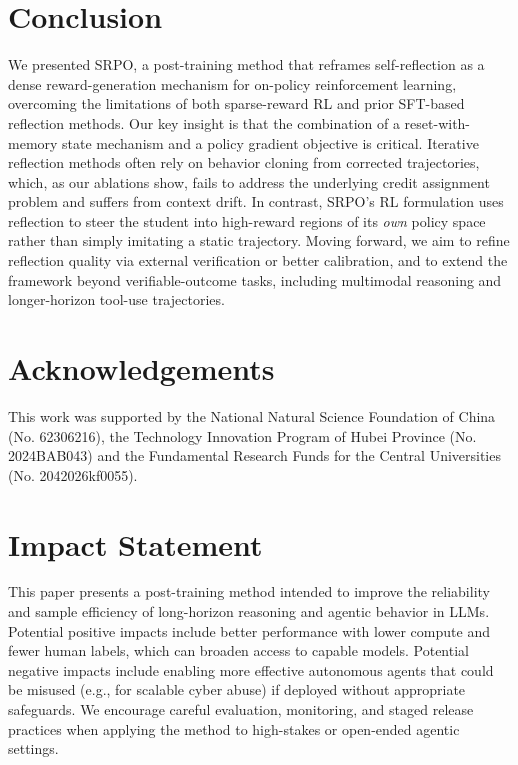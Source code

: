\documentclass{article}
\newcommand{\method}{SRPO}
\theoremstyle{plain}
\theoremstyle{definition}
\theoremstyle{remark}
\begin{document}
\section{Conclusion}
\label{conclusion}

We presented \method{}, a post-training method that reframes self-reflection as a dense reward-generation mechanism for on-policy reinforcement learning, overcoming the limitations of both sparse-reward RL and prior SFT-based reflection methods. Our key insight is that the combination of a reset-with-memory state mechanism and a policy gradient objective is critical. Iterative reflection methods often rely on behavior cloning from corrected trajectories, which, as our ablations show, fails to address the underlying credit assignment problem and suffers from context drift. In contrast, SRPO's RL formulation uses reflection to steer the student into high-reward regions of its \emph{own} policy space rather than simply imitating a static trajectory. Moving forward, we aim to refine reflection quality via external verification or better calibration, and to extend the framework beyond verifiable-outcome tasks, including multimodal reasoning and longer-horizon tool-use trajectories.
\newpage

\section*{Acknowledgements}
This work was supported by the National Natural Science Foundation of China
(No. 62306216), the Technology Innovation Program of Hubei Province
(No. 2024BAB043) and the Fundamental Research Funds for the Central Universities 
(No. 2042026kf0055).

\section*{Impact Statement}
This paper presents a post-training method intended to improve the reliability and sample efficiency of long-horizon reasoning and agentic behavior in LLMs.
Potential positive impacts include better performance with lower compute and fewer human labels, which can broaden access to capable models.
Potential negative impacts include enabling more effective autonomous agents that could be misused (e.g., for scalable cyber abuse) if deployed without appropriate safeguards.
We encourage careful evaluation, monitoring, and staged release practices when applying the method to high-stakes or open-ended agentic settings.
\end{document}
